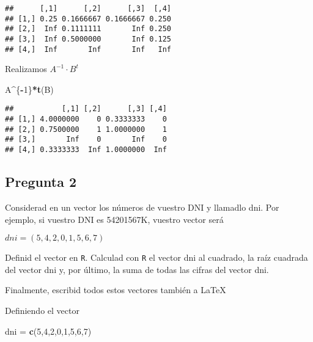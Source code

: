 \documentclass[
]{article}
\newenvironment{Shaded}{\begin{snugshade}}{\end{snugshade}}
\newcommand{\DecValTok}[1]{\textcolor[rgb]{0.00,0.00,0.81}{#1}}
\newcommand{\KeywordTok}[1]{\textcolor[rgb]{0.13,0.29,0.53}{\textbf{#1}}}
\newcommand{\NormalTok}[1]{#1}
\newcommand{\OperatorTok}[1]{\textcolor[rgb]{0.81,0.36,0.00}{\textbf{#1}}}
\newcommand{\StringTok}[1]{\textcolor[rgb]{0.31,0.60,0.02}{#1}}
\begin{document}
\begin{verbatim}
##      [,1]      [,2]      [,3]  [,4]
## [1,] 0.25 0.1666667 0.1666667 0.250
## [2,]  Inf 0.1111111       Inf 0.250
## [3,]  Inf 0.5000000       Inf 0.125
## [4,]  Inf       Inf       Inf   Inf
\end{verbatim}

Realizamos \(A^{-1}\cdot B^t\)

\begin{Shaded}
\begin{Highlighting}[]
\NormalTok{A}\OperatorTok{^}\NormalTok{\{}\OperatorTok{-}\DecValTok{1}\NormalTok{\}}\OperatorTok{*}\KeywordTok{t}\NormalTok{(B)}
\end{Highlighting}
\end{Shaded}

\begin{verbatim}
##           [,1] [,2]      [,3] [,4]
## [1,] 4.0000000    0 0.3333333    0
## [2,] 0.7500000    1 1.0000000    1
## [3,]       Inf    0       Inf    0
## [4,] 0.3333333  Inf 1.0000000  Inf
\end{verbatim}

\hypertarget{pregunta-2}{%
\subsection{Pregunta 2}\label{pregunta-2}}

Considerad en un vector los números de vuestro DNI y llamadlo dni. Por
ejemplo, si vuestro DNI es 54201567K, vuestro vector será

\begin{center}
$dni = (5, 4, 2, 0, 1, 5, 6, 7)$
\end{center}

Definid el vector en \texttt{R}. Calculad con \texttt{R} el vector dni
al cuadrado, la raíz cuadrada del vector dni y, por último, la suma de
todas las cifras del vector dni.

Finalmente, escribid todos estos vectores también a \LaTeX

Definiendo el vector

\begin{Shaded}
\begin{Highlighting}[]
\NormalTok{dni =}\StringTok{ }\KeywordTok{c}\NormalTok{(}\DecValTok{5}\NormalTok{,}\DecValTok{4}\NormalTok{,}\DecValTok{2}\NormalTok{,}\DecValTok{0}\NormalTok{,}\DecValTok{1}\NormalTok{,}\DecValTok{5}\NormalTok{,}\DecValTok{6}\NormalTok{,}\DecValTok{7}\NormalTok{)}
\end{Highlighting}
\end{Shaded}
\end{document}
